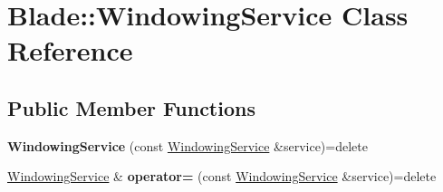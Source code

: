 \hypertarget{class_blade_1_1_windowing_service}{}\section{Blade\+:\+:Windowing\+Service Class Reference}
\label{class_blade_1_1_windowing_service}
\subsection*{Public Member Functions}
\begin{DoxyCompactItemize}
\item 
\mbox{\label{class_blade_1_1_windowing_service_a321963043ad61bacadf6b566642341d7}} 
{\bfseries Windowing\+Service} (const \hyperlink{class_blade_1_1_windowing_service}{Windowing\+Service} \&service)=delete
\item 
\mbox{\label{class_blade_1_1_windowing_service_a43e16945b6c244c5b08313a3d62d78aa}} 
\hyperlink{class_blade_1_1_windowing_service}{Windowing\+Service} \& {\bfseries operator=} (const \hyperlink{class_blade_1_1_windowing_service}{Windowing\+Service} \&service)=delete
\end{DoxyCompactItemize}
